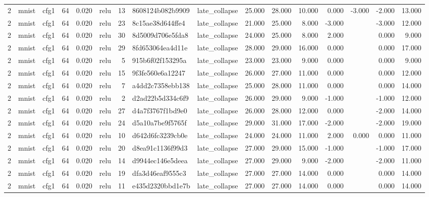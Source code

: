 \begin{table}[htbp]
{\begin{tabular}{@{}rllrrlrllrrrrrrr@{}}
2 & mnist & cfg1 & 64 & 0.020 & relu & 13 & 8608124b082b9909 & late\_collapse & 25.000 & 28.000 & 10.000 & 0.000 & -3.000 & -2.000 & 13.000 \\
2 & mnist & cfg1 & 64 & 0.020 & relu & 23 & 8c15ae38d644ffe4 & late\_collapse & 21.000 & 25.000 & 8.000 & -3.000 &  & -3.000 & 12.000 \\
2 & mnist & cfg1 & 64 & 0.020 & relu & 30 & 8d5009d706e5fda8 & late\_collapse & 24.000 & 25.000 & 8.000 & 2.000 &  & 0.000 & 9.000 \\
2 & mnist & cfg1 & 64 & 0.020 & relu & 29 & 8fd653064ea4d11e & late\_collapse & 28.000 & 29.000 & 16.000 & 0.000 &  & 0.000 & 17.000 \\
2 & mnist & cfg1 & 64 & 0.020 & relu & 5 & 915b6f02f153295a & late\_collapse & 23.000 & 23.000 & 9.000 & 0.000 &  & 0.000 & 9.000 \\
2 & mnist & cfg1 & 64 & 0.020 & relu & 15 & 9f3fe560e6a12247 & late\_collapse & 26.000 & 27.000 & 11.000 & 0.000 &  & 0.000 & 12.000 \\
2 & mnist & cfg1 & 64 & 0.020 & relu & 7 & a4dd2c7358ebb138 & late\_collapse & 25.000 & 28.000 & 11.000 & 0.000 &  & 0.000 & 14.000 \\
2 & mnist & cfg1 & 64 & 0.020 & relu & 2 & d2ad22b5d334c6f9 & late\_collapse & 26.000 & 29.000 & 9.000 & -1.000 &  & -1.000 & 12.000 \\
2 & mnist & cfg1 & 64 & 0.020 & relu & 27 & d4a7f3767f1bd9e0 & late\_collapse & 26.000 & 28.000 & 12.000 & 0.000 &  & -2.000 & 14.000 \\
2 & mnist & cfg1 & 64 & 0.020 & relu & 24 & d5a10a7be9f5765f & late\_collapse & 29.000 & 31.000 & 17.000 & -2.000 &  & -2.000 & 19.000 \\
2 & mnist & cfg1 & 64 & 0.020 & relu & 10 & d642d6fc3239cb0e & late\_collapse & 24.000 & 24.000 & 11.000 & 2.000 & 0.000 & 0.000 & 11.000 \\
2 & mnist & cfg1 & 64 & 0.020 & relu & 20 & d8ea91c1136f99d3 & late\_collapse & 27.000 & 29.000 & 15.000 & -1.000 &  & -1.000 & 17.000 \\
2 & mnist & cfg1 & 64 & 0.020 & relu & 14 & d9944ec146e5deea & late\_collapse & 27.000 & 29.000 & 9.000 & -2.000 &  & -2.000 & 11.000 \\
2 & mnist & cfg1 & 64 & 0.020 & relu & 19 & dfa3d46eaf9555c3 & late\_collapse & 27.000 & 27.000 & 14.000 & 0.000 &  & 0.000 & 14.000 \\
2 & mnist & cfg1 & 64 & 0.020 & relu & 11 & e435d2320bbd1e7b & late\_collapse & 27.000 & 27.000 & 14.000 & 0.000 &  & 0.000 & 14.000 \\

\end{tabular}}
\end{table}
